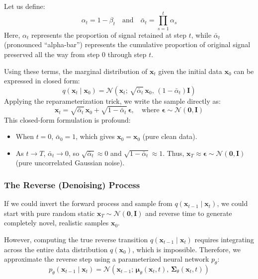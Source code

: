 Let us define:
\begin{equation}
\alpha_t = 1 - \beta_t \quad \text{and} \quad \bar{\alpha}_t = \prod_{s=1}^t \alpha_s\label{eq:alpha_definitions}
\end{equation}
Here, $\alpha_t$ represents the proportion of signal retained at step $t$, while $\bar{\alpha}_t$ (pronounced ``alpha-bar'') represents the cumulative proportion of original signal preserved all the way from step $0$ through step $t$.

Using these terms, the marginal distribution of $\mathbf{x}_t$ given the initial data $\mathbf{x}_0$ can be expressed in closed form:
\begin{equation}
q(\mathbf{x}_t \mid \mathbf{x}_0) = \mathcal{N}\left(\mathbf{x}_t;\, \sqrt{\bar{\alpha}_t}\,\mathbf{x}_0,\, (1 - \bar{\alpha}_t)\mathbf{I}\right)\label{eq:fwd_closed_form}
\end{equation}
Applying the reparameterization trick, we write the sample directly as:
\begin{equation}
\mathbf{x}_t = \sqrt{\bar{\alpha}_t}\,\mathbf{x}_0 + \sqrt{1 - \bar{\alpha}_t}\,\boldsymbol{\epsilon}, \quad \text{where } \boldsymbol{\epsilon} \sim \mathcal{N}(\mathbf{0}, \mathbf{I})\label{eq:fwd_reparam}
\end{equation}
This closed-form formulation is profound:
\begin{itemize}
    \item When $t = 0$, $\bar{\alpha}_0 = 1$, which gives $\mathbf{x}_0 = \mathbf{x}_0$ (pure clean data).
    \item As $t \to T$, $\bar{\alpha}_t \to 0$, so $\sqrt{\bar{\alpha}_t} \approx 0$ and $\sqrt{1 - \bar{\alpha}_t} \approx 1$. Thus, $\mathbf{x}_T \approx \boldsymbol{\epsilon} \sim \mathcal{N}(\mathbf{0}, \mathbf{I})$ (pure uncorrelated Gaussian noise).
\end{itemize}

\subsubsection{The Reverse (Denoising) Process}
If we could invert the forward process and sample from $q(\mathbf{x}_{t-1} \mid \mathbf{x}_t)$, we could start with pure random static $\mathbf{x}_T \sim \mathcal{N}(\mathbf{0}, \mathbf{I})$ and reverse time to generate completely novel, realistic samples $\mathbf{x}_0$. 

However, computing the true reverse transition $q(\mathbf{x}_{t-1} \mid \mathbf{x}_t)$ requires integrating across the entire data distribution $q(\mathbf{x}_0)$, which is impossible. Therefore, we approximate the reverse step using a parameterized neural network $p_\theta$:
\begin{equation}
p_\theta(\mathbf{x}_{t-1} \mid \mathbf{x}_t) = \mathcal{N}\left(\mathbf{x}_{t-1};\, \boldsymbol{\mu}_\theta(\mathbf{x}_t, t),\, \boldsymbol{\Sigma}_\theta(\mathbf{x}_t, t)\right)\label{eq:reverse_distribution}
\end{equation}

